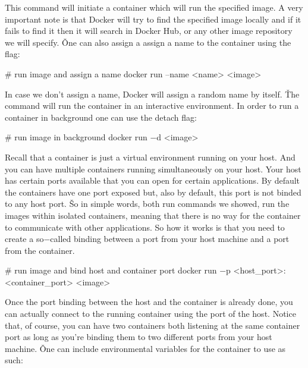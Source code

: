 This command will initiate a container which will run the specified image. A very important note is that Docker will
try to find the specified image locally and if it fails to find it then it will search in Docker Hub, or any other
image repository we will specify. \v

One can also assign a assign a name to the container using the  flag:

\begin{bash}
# run image and assign a name
docker run --name <name> <image>
\end{bash}

In case we don't assign a name, Docker will assign a random name by itself. \v

The  command will run the container in an interactive environment. In order to run a container in
background one can use the detach  flag:

\begin{bash}
# run image in background
docker run $-$d <image>
\end{bash}

Recall that a container is just a virtual environment running on your host. And you can have multiple containers
running simultaneously on your host. Your host has certain ports available that you can open for certain applications.
By default the containers have one port exposed but, also by default, this port is not binded to any host port. \v

So in simple words, both run commands we showed, run the images within isolated containers, meaning that there is no
way for the container to communicate with other applications. So how it works is that you need to create a
so$-$called binding between a port from your host machine and a port from the container.

\begin{bash}
# run image and bind host and container port
docker run $-$p <host_port>:<container_port> <image>
\end{bash}

Once the port binding between the host and the container is already done, you can actually connect to the running
container using the port of the host. Notice that, of course, you can have two containers both listening at the same
container port as long as you're binding them to two different ports from your host machine. \v

One can include environmental variables for the container to use as such:

